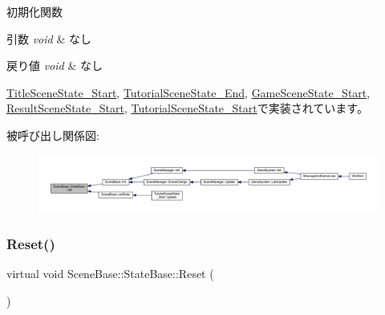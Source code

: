 初期化関数 


\begin{DoxyParams}{引数}
{\em void} & なし \\
\hline
\end{DoxyParams}

\begin{DoxyRetVals}{戻り値}
{\em void} & なし \\
\hline
\end{DoxyRetVals}


\mbox{\hyperlink{class_title_scene_state___start_a3e785ba088ac3fd0989fd657e5d0cd34}{Title\+Scene\+State\+\_\+\+Start}}, \mbox{\hyperlink{class_tutorial_scene_state___end_a572e5687140ff5ac43789f90462c05a5}{Tutorial\+Scene\+State\+\_\+\+End}}, \mbox{\hyperlink{class_game_scene_state___start_ae921c57f349fbb2f00a197d40a3404b7}{Game\+Scene\+State\+\_\+\+Start}}, \mbox{\hyperlink{class_result_scene_state___start_a615c7e05efd2320b8956c5fd94398f55}{Result\+Scene\+State\+\_\+\+Start}}, \mbox{\hyperlink{class_tutorial_scene_state___start_acd4cd7e4efeebffa9616d7ca31c7b1c0}{Tutorial\+Scene\+State\+\_\+\+Start}}で実装されています。

被呼び出し関係図\+:
\nopagebreak
\begin{figure}[H]
\begin{center}
\leavevmode
\includegraphics[width=350pt]{class_scene_base_1_1_state_base_a33350231b039a2178c19beac0211c5b8_icgraph}
\end{center}
\end{figure}
\mbox{\label{class_scene_base_1_1_state_base_a2e14a3afece0b1d8db9edcebf514a977}} 
\subsubsection{\texorpdfstring{Reset()}{Reset()}}
{\footnotesize\ttfamily virtual void Scene\+Base\+::\+State\+Base\+::\+Reset (\begin{DoxyParamCaption}{ }\end{DoxyParamCaption})\hspace{0.3cm}{\ttfamily [pure virtual]}}



